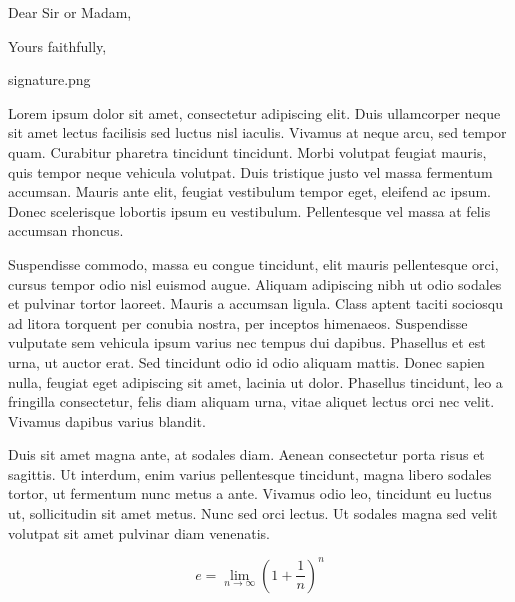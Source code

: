 \documentclass[11pt,a4paper,sans]{moderncv}        %
\begin{document}
\clearpage
\date{January 01, 1984}
\subject{Job application}
\opening{Dear Sir or Madam,}
\closing{Yours faithfully,}
\signature{0.9}{signature.png}                     %
\makelettertitle

Lorem ipsum dolor sit amet, consectetur adipiscing elit. Duis ullamcorper neque sit amet lectus facilisis sed luctus nisl iaculis. Vivamus at neque arcu, sed tempor quam. Curabitur pharetra tincidunt tincidunt. Morbi volutpat feugiat mauris, quis tempor neque vehicula volutpat. Duis tristique justo vel massa fermentum accumsan. Mauris ante elit, feugiat vestibulum tempor eget, eleifend ac ipsum. Donec scelerisque lobortis ipsum eu vestibulum. Pellentesque vel massa at felis accumsan rhoncus.

Suspendisse commodo, massa eu congue tincidunt, elit mauris pellentesque orci, cursus tempor odio nisl euismod augue. Aliquam adipiscing nibh ut odio sodales et pulvinar tortor laoreet. Mauris a accumsan ligula. Class aptent taciti sociosqu ad litora torquent per conubia nostra, per inceptos himenaeos. Suspendisse vulputate sem vehicula ipsum varius nec tempus dui dapibus. Phasellus et est urna, ut auctor erat. Sed tincidunt odio id odio aliquam mattis. Donec sapien nulla, feugiat eget adipiscing sit amet, lacinia ut dolor. Phasellus tincidunt, leo a fringilla consectetur, felis diam aliquam urna, vitae aliquet lectus orci nec velit. Vivamus dapibus varius blandit.

Duis sit amet magna ante, at sodales diam. Aenean consectetur porta risus et sagittis. Ut interdum, enim varius pellentesque tincidunt, magna libero sodales tortor, ut fermentum nunc metus a ante. Vivamus odio leo, tincidunt eu luctus ut, sollicitudin sit amet metus. Nunc sed orci lectus. Ut sodales magna sed velit volutpat sit amet pulvinar diam venenatis.

\[ e=\lim_{n \to \infty} \left(1+\frac{1}{n}\right)^n \]

\makeletterclosing

\end{document}
